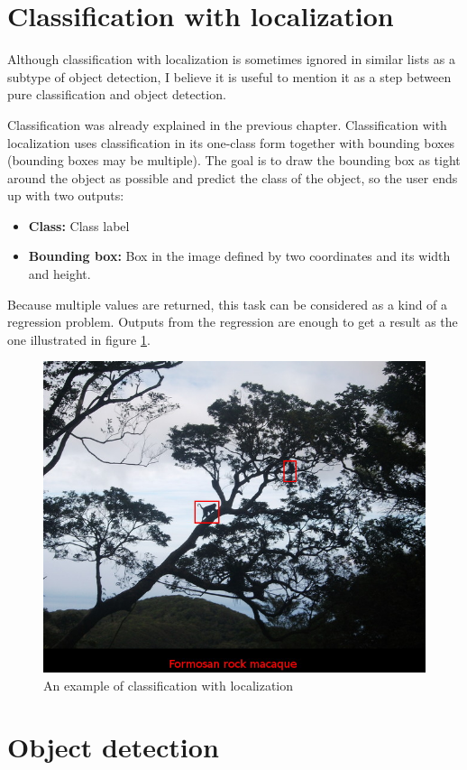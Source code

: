 \section{Classification with localization}
\label{classification-localization}

Although classification with localization is sometimes ignored in similar lists as a subtype of object detection, I believe it is useful to mention it as a step between pure classification and object detection.

Classification was already explained in the previous chapter. Classification with localization uses classification in its one-class form together with bounding boxes (bounding boxes may be multiple). The goal is to draw the bounding box as tight around the object as possible and predict the class of the object, so the user ends up with two outputs:
\begin{itemize}
	\item \textbf{Class:} Class label
	\item \textbf{Bounding box:} Box in the image defined by two coordinates and its width and height.
\end{itemize}

Because multiple values are returned, this task can be considered as a kind of a regression problem. Outputs from the regression are enough to get a result as the one illustrated in figure \ref{fig:class-loc}. 

\begin{figure}[H]
   \centering
	\includegraphics[width=.7\linewidth]{./pictures/class-loc.JPG}
	\caption[Classification with localization example]{An example of classification with localization}
      \label{fig:class-loc}
\end{figure}

\section{Object detection}
\label{object-detection}

